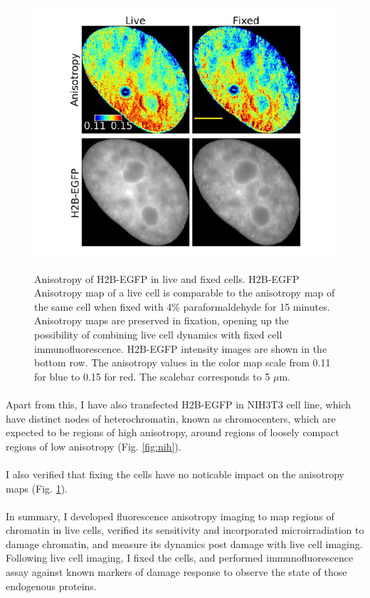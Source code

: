\begin{figure}[H]
    {\hfill\includegraphics[clip,width=0.8\linewidth]{figures/fixing.png}\hspace*{\fill}}
    \caption{Anisotropy of H2B-EGFP in live and fixed cells. H2B-EGFP Anisotropy map of a live cell is comparable to the anisotropy map of the same cell when fixed with 4\% paraformaldehyde for 15 minutes. Anisotropy maps are preserved in fixation, opening up the possibility of combining live cell dynamics with fixed cell immunofluorescence. H2B-EGFP intensity images are shown in the bottom row. The anisotropy values in the color map scale from 0.11 for blue to 0.15 for red. The scalebar corresponds to 5 $\mu$m.}
    {\label{fig:fixing}}
\end{figure}


\paragraph*{} Apart from this, I have also transfected H2B-EGFP in NIH3T3 cell line, which have distinct nodes of heterochromatin, known as chromocenters, which are expected to be regions of high anisotropy, around regions of loosely compact regions of low anisotropy (Fig. \ref{fig:nih}).

\paragraph*{} I also verified that fixing the cells have no noticable impact on the anisotropy maps (Fig. \ref{fig:fixing}).

\paragraph*{} In summary, I developed fluorescence anisotropy imaging to map regions of chromatin in live cells, verified its sensitivity and incorporated microirradiation to damage chromatin, and measure its dynamics post damage with live cell imaging. Following live cell imaging, I fixed the cells, and performed immunofluorescence assay against known markers of damage response to observe the state of those endogenous proteins.
